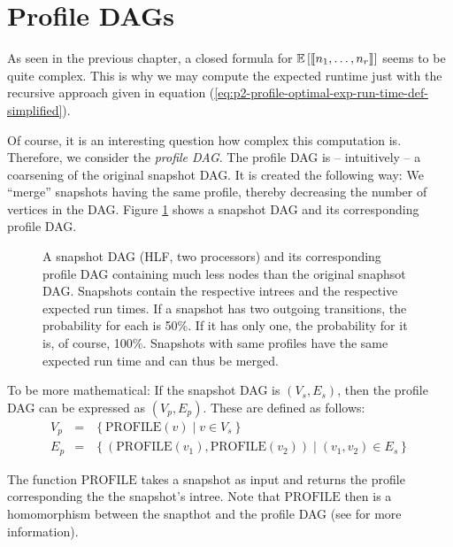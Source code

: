 
\section{Profile DAGs}
\label{sec:p2-profile-dags}

As seen in the previous chapter, a closed formula for $\mathbb{E}\left[ \left\llbracket n_1,\dots,n_r \right\rrbracket \right]$ seems to be quite complex. This is why we may compute the expected runtime just with the recursive approach given in equation (\ref{eq:p2-profile-optimal-exp-run-time-def-simplified}).

Of course, it is an interesting question how complex this computation is. Therefore, we consider the \emph{profile DAG}. The profile DAG is -- intuitively -- a coarsening of the original snapshot DAG. It is created the following way: We ``merge'' snapshots having the same profile, thereby decreasing the number of vertices in the DAG. Figure \ref{fig:p2-profile-dag-example-000111223-hlfdet} shows a snapshot DAG and its corresponding profile DAG.

\begin{figure}[t]
  \centering
  
  \caption{A snapshot DAG (HLF, two processors) and its corresponding profile DAG containing much less nodes than the original snaphsot DAG. Snapshots contain the respective intrees and the respective expected run times. If a snapshot has two outgoing transitions, the probability for each is 50\%. If it has only one, the probability for it is, of course, 100\%. Snapshots with same profiles have the same expected run time and can thus be merged. }
  \label{fig:p2-profile-dag-example-000111223-hlfdet}
\end{figure}

To be more mathematical: If the snapshot DAG is $(V_s, E_s)$, then the profile DAG can be expressed as $(V_p, E_p)$. These are defined as follows:
\begin{eqnarray*}
  V_p &=& \left\{ \text{PROFILE}(v) \mid v \in V_s \right\} \\
  E_p &=& \left\{ \left(\text{PROFILE}(v_1), \text{PROFILE}(v_2) \right) \mid (v_1, v_2)\in E_s\right\}
\end{eqnarray*}

The function $\text{PROFILE}$ takes a snapshot as input and returns the profile corresponding the the snapshot's intree. Note that $\text{PROFILE}$ then is a homomorphism between the snapthot and the profile DAG (see \cite{hell2004graphs} for more information).

